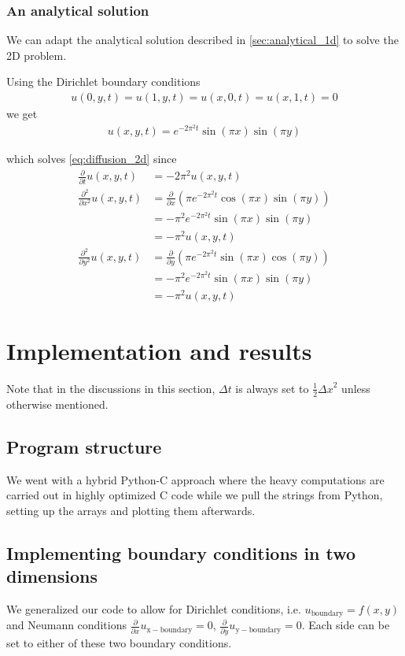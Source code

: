 \documentclass[10pt,a4paper]{article}
\newcommand{\dt}{{\Delta t}}
\newcommand{\dx}{{\Delta x}}
\newcommand{\fracpt}{\frac{\partial}{\partial t}}
\newcommand{\fracpx}{\frac{\partial}{\partial x}}
\newcommand{\fracpy}{\frac{\partial}{\partial y}}
\newcommand{\fracpxx}{\frac{\partial^2}{\partial x^2}}
\newcommand{\fracpyy}{\frac{\partial^2}{\partial y^2}}
\begin{document}
\subsubsection{An analytical solution}
We can adapt the analytical solution described in \vref{sec:analytical_1d} to solve the 2D problem.

Using the Dirichlet boundary conditions
\begin{align}
u(0, y, t) = u(1, y, t) = u(x, 0, t) = u(x, 1, t) = 0
\end{align}
we get
\begin{align}\label{eq:analytical_2d}
    u(x, y, t) = e^{-2\pi^2 t} \sin(\pi x) \sin(\pi y)
\end{align}

which solves \vref{eq:diffusion_2d} since
\begin{align}
\fracpt u(x, y, t) &= -2\pi^2 u(x, y, t) \\
\fracpxx u(x, y, t) &= \fracpx \left( \pi e^{-2\pi^2 t} \cos(\pi x) \sin(\pi y) \right) \\
&= -\pi^2 e^{-2\pi^2 t} \sin(\pi x) \sin(\pi y) \\
&= -\pi^2 u(x, y, t) \\
\fracpyy u(x, y, t) &= \fracpy \left( \pi e^{-2\pi^2 t} \sin(\pi x) \cos(\pi y) \right) \\
&= -\pi^2 e^{-2\pi^2 t} \sin(\pi x) \sin(\pi y) \\
&= -\pi^2 u(x, y, t)
\end{align}



\section{Implementation and results}\label{sec:implementation_and_results}
Note that in the discussions in this section, $\dt$ is always set to $\frac{1}{2}\dx^2$ unless otherwise mentioned.

\subsection{Program structure}
We went with a hybrid Python-C approach where the heavy computations are carried out in highly optimized C code while we pull the strings from Python, setting up the arrays and plotting them afterwards.


\subsection{Implementing boundary conditions in two dimensions}
We generalized our code to allow for Dirichlet conditions, i.e. $u_{\mathrm{boundary}} = f(x, y)$ and Neumann conditions $\fracpx u_{\mathrm{x-boundary}} = 0$, $\fracpy u_{\mathrm{y-boundary}} = 0$. Each side can be set to either of these two boundary conditions.
\end{document}
